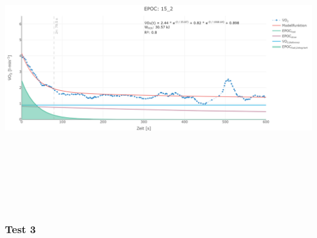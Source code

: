 \documentclass[
  letterpaper,
  DIV=11]{scrartcl}
\begin{document}
\includegraphics[width=11.45833in,height=4.6875in]{images/15_2.png}

\subsubsection{Test 3}
\end{document}
